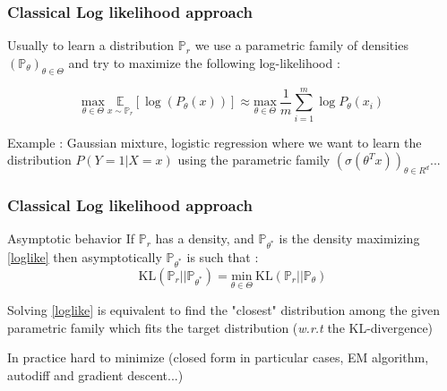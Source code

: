 \documentclass[french,9pt]{beamer}
\begin{document}

\begin{frame}
\frametitle{Classical Log likelihood approach}

Usually to learn a distribution $\mathbb{P}_{r}$ we use a parametric family of densities $(\mathbb{P}_{\theta})_{\theta \in \Theta}$ and try to maximize the following log-likelihood  :

\begin{equation}
\label{loglike}
 \underset{\theta \in \Theta}{\text{max}} \ \underset{x \sim \mathbb{P}_{r} }{\mathbb{E}}[\log(P_{\theta}(x))] \approx \underset{\theta \in \Theta}{\text{max}} \ \frac{1}{m} \sum_{i=1}^{m} \log P_{\theta}(x_{i})
 \end{equation}

Example : Gaussian mixture, logistic regression where we want to learn the distribution $P(Y=1|X=x)$ using the parametric family $(\sigma(\theta^{T} x))_{\theta \in R^{d}}$...

\begin{center}
\end{center}

\end{frame}

\begin{frame}
\frametitle{Classical Log likelihood approach}

\begin{block}{Asymptotic behavior}
If $\mathbb{P}_{r}$ has a density, and $\mathbb{P}_{\theta^{*}}$ is the density maximizing \eqref{loglike} then asymptotically $\mathbb{P}_{\theta^{*}}$ is such that : 
$$\text{KL}(\mathbb{P}_{r}||\mathbb{P}_{\theta^{*}})= \underset{\theta \in \Theta}{\text{min}} \ \text{KL}(\mathbb{P}_{r}||\mathbb{P}_{\theta})$$

Solving \eqref{loglike} is equivalent to find the "closest" distribution among the given parametric family which fits the target distribution (\textit{w.r.t} the KL-divergence)
\end{block}

In practice hard to minimize (closed form in particular cases, EM algorithm, autodiff and gradient descent...)

\end{frame}
\end{document}
